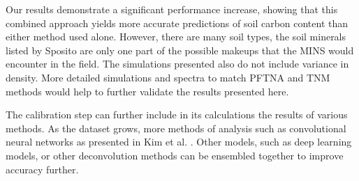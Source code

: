 \documentclass[preprint, 12pt]{elsarticle}
\begin{document}
Our results demonstrate a significant performance increase, showing that this combined approach yields more accurate predictions of soil carbon content than either method used alone. However, there are many soil types, the soil minerals listed by Sposito \cite{sposito_chemistry_2008} are only one part of the possible makeups that the MINS would encounter in the field. The simulations presented also do not include variance in density. More detailed simulations and spectra to match PFTNA and TNM methods would help to further validate the results presented here.

The calibration step can further include in its calculations the results of various methods. As the dataset grows, more methods of analysis such as convolutional neural networks as presented in Kim et al. \cite{kim_deep_2025}. Other models, such as deep learning models, or other deconvolution methods can be ensembled together to improve accuracy further.



\end{document}
